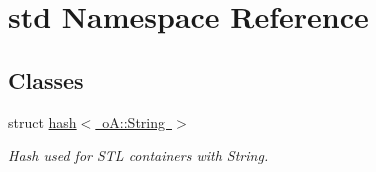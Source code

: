 \hypertarget{namespacestd}{}\section{std Namespace Reference}
\label{namespacestd}
\subsection*{Classes}
\begin{DoxyCompactItemize}
\item 
struct \mbox{\hyperlink{structstd_1_1hash_3_01o_a_1_1_string_01_4}{hash$<$ o\+A\+::\+String $>$}}
\begin{DoxyCompactList}\small\item\em Hash used for S\+TL containers with String. \end{DoxyCompactList}\end{DoxyCompactItemize}
